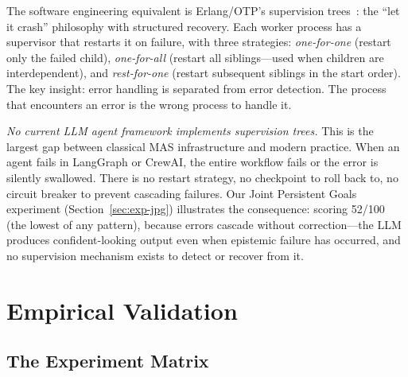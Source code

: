 \documentclass{article}
\begin{document}
The software engineering equivalent is Erlang/OTP's supervision
trees~\citep{armstrong2003erlang}: the ``let it crash'' philosophy with structured
recovery. Each worker process has a supervisor that restarts it on failure, with three
strategies: \emph{one-for-one} (restart only the failed child), \emph{one-for-all}
(restart all siblings---used when children are interdependent), and \emph{rest-for-one}
(restart subsequent siblings in the start order). The key insight: error handling is
separated from error detection. The process that encounters an error is the wrong
process to handle it.

\emph{No current LLM agent framework implements supervision trees.} This is the largest
gap between classical MAS infrastructure and modern practice. When an agent fails in
LangGraph or CrewAI, the entire workflow fails or the error is silently swallowed. There
is no restart strategy, no checkpoint to roll back to, no circuit breaker to prevent
cascading failures. Our Joint Persistent Goals experiment (Section~\ref{sec:exp-jpg})
illustrates the consequence: scoring 52/100 (the lowest of any pattern), because errors
cascade without correction---the LLM produces confident-looking output even when
epistemic failure has occurred, and no supervision mechanism exists to detect or recover
from it.


\section{Empirical Validation}
\label{sec:experiments}

\subsection{The Experiment Matrix}
\label{sec:exp-matrix}

%
%
%
%
%
\end{document}
